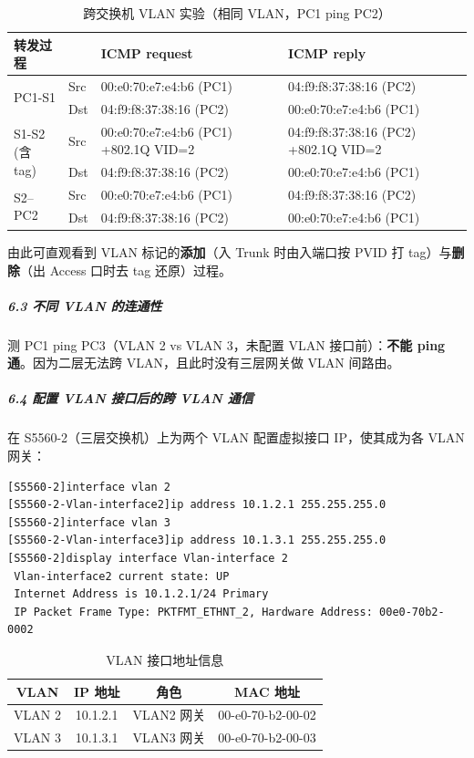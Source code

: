 \documentclass[12pt,a4paper]{article}
\begin{document}
\begin{table}[H]
\centering
\caption{跨交换机 VLAN 实验（相同 VLAN，PC1 ping PC2）}
\begin{tabular}{p{1.7cm}p{1.0cm}p{5.2cm}p{5.2cm}}
\toprule
转发过程 & & \textbf{ICMP request} & \textbf{ICMP reply} \\
\midrule
\multirow{2}{*}{PC1-S1}
 & Src & 00:e0:70:e7:e4:b6 (PC1) & 04:f9:f8:37:38:16 (PC2) \\
 & Dst & 04:f9:f8:37:38:16 (PC2) & 00:e0:70:e7:e4:b6 (PC1) \\
\midrule
\multirow{2}{*}{\parbox{1.7cm}{S1-S2\\(含 tag)}}
 & Src & 00:e0:70:e7:e4:b6 (PC1) \newline +802.1Q VID=2 & 04:f9:f8:37:38:16 (PC2) \newline +802.1Q VID=2 \\
 & Dst & 04:f9:f8:37:38:16 (PC2) & 00:e0:70:e7:e4:b6 (PC1) \\
\midrule
\multirow{2}{*}{S2--PC2}
 & Src & 00:e0:70:e7:e4:b6 (PC1) & 04:f9:f8:37:38:16 (PC2) \\
 & Dst & 04:f9:f8:37:38:16 (PC2) & 00:e0:70:e7:e4:b6 (PC1) \\
\bottomrule
\end{tabular}
\end{table}

\noindent 由此可直观看到 VLAN 标记的\textbf{添加}（入 Trunk 时由入端口按 PVID 打 tag）与\textbf{删除}（出 Access 口时去 tag 还原）过程。

\subparagraph{6.3 不同 VLAN 的连通性}
测 PC1 ping PC3（VLAN 2 vs VLAN 3，未配置 VLAN 接口前）：\textbf{不能 ping 通}。因为二层无法跨 VLAN，且此时没有三层网关做 VLAN 间路由。

\subparagraph{6.4 配置 VLAN 接口后的跨 VLAN 通信}
在 S5560-2（三层交换机）上为两个 VLAN 配置虚拟接口 IP，使其成为各 VLAN 网关：
\begin{lstlisting}[style=cli]
[S5560-2]interface vlan 2
[S5560-2-Vlan-interface2]ip address 10.1.2.1 255.255.255.0
[S5560-2]interface vlan 3
[S5560-2-Vlan-interface3]ip address 10.1.3.1 255.255.255.0
[S5560-2]display interface Vlan-interface 2
 Vlan-interface2 current state: UP
 Internet Address is 10.1.2.1/24 Primary
 IP Packet Frame Type: PKTFMT_ETHNT_2, Hardware Address: 00e0-70b2-0002
\end{lstlisting}

\begin{table}[H]
\centering
\caption{VLAN 接口地址信息}
\begin{tabular}{cccc}
\toprule
VLAN & IP 地址 & 角色 & MAC 地址 \\
\midrule
VLAN 2 & 10.1.2.1 & VLAN2 网关 & 00-e0-70-b2-00-02 \\
VLAN 3 & 10.1.3.1 & VLAN3 网关 & 00-e0-70-b2-00-03 \\
\bottomrule
\end{tabular}
\end{table}
\end{document}

